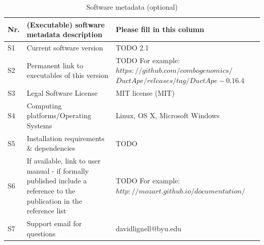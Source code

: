\documentclass[preprint,12pt, a4paper]{elsarticle}
\begin{document}
\begin{table}[!h]
\begin{tabular}{|l|p{6.5cm}|p{6.5cm}|}
\hline
\textbf{Nr.} & \textbf{(Executable) software metadata description} & \textbf{Please fill in this column} \\
\hline
S1 & Current software version & TODO 2.1 \\
\hline
S2 & Permanent link to executables of this version  & TODO For example: $https://github.com/combogenomics/$ $DuctApe/releases/tag/DuctApe-0.16.4$ \\
\hline
S3 & Legal Software License & MIT license (MIT) \\
\hline
S4 & Computing platforms/Operating Systems & Linux, OS X, Microsoft Windows\\
\hline
S5 & Installation requirements \& dependencies & TODO \\
\hline
S6 & If available, link to user manual - if formally published include a reference to the publication in the reference
    list & TODO For example: $http://mozart.github.io/documentation/$ \\
\hline
S7 & Support email for questions & davidlignell@byu.edu \\
\hline
\end{tabular}
\caption{Software metadata (optional)}
\label{} 
\end{table}
\end{document}
